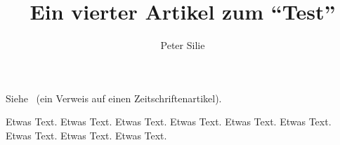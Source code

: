 \documentclass{dtk2}
\author{Peter Silie}
\begin{document}
\title{Ein vierter Artikel zum "`Test"'}

\maketitle

Siehe~\cite{Niepraschk-dtk15.1:niepraschk.voss:texlivelist} (ein Verweis auf
einen Zeitschriftenartikel).

Etwas Text. Etwas Text. Etwas Text. Etwas Text. Etwas Text. Etwas Text.
Etwas Text. Etwas Text. Etwas Text.

\printbibliography
\end{document}
